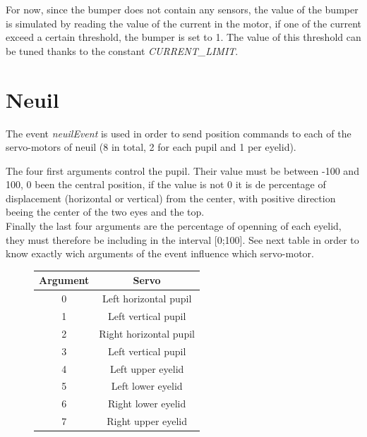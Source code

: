 \documentclass[a4paper,11pt]{report}
\begin{document}
For now, since the bumper does not contain any sensors, the value of the bumper is simulated by reading the value of the current in the motor, if one of the current exceed a certain threshold, the bumper is set to 1. The value of this threshold can be tuned thanks to the constant \textit{CURRENT\_LIMIT}. %

\section{Neuil}

The event \textit{neuilEvent} is used in order to send position commands to each of the servo-motors of neuil (8 in total, 2 for each pupil and 1 per eyelid).

The four first arguments control the pupil. Their value must be between -100 and 100, 0 been the central position, if the value is not 0 it is de percentage of displacement (horizontal or vertical) from the center, with positive direction beeing the center of the two eyes and the top.\\ 

Finally the last four arguments are the percentage of openning of each eyelid, they must therefore be including in the interval [0;100]. See next table in order to know exactly wich arguments of the event influence which servo-motor.\\

\begin{figure}[H]
\begin{center}
\begin{tabular}{|c|c|}
   \hline
   \textbf{Argument} & \textbf{Servo}\\
   \hline
   \hline
   0 & Left horizontal pupil\\
   \hline
   1 & Left vertical pupil\\
   \hline
   2 & Right horizontal pupil\\
   \hline
   3 & Left vertical pupil\\
   \hline
   4 & Left upper eyelid\\
   \hline
   5 & Left lower eyelid\\
   \hline
   6 & Right lower eyelid\\
   \hline
   7 & Right upper eyelid\\
   \hline
\end{tabular}
\end{center}
\end{figure}
\end{document}
